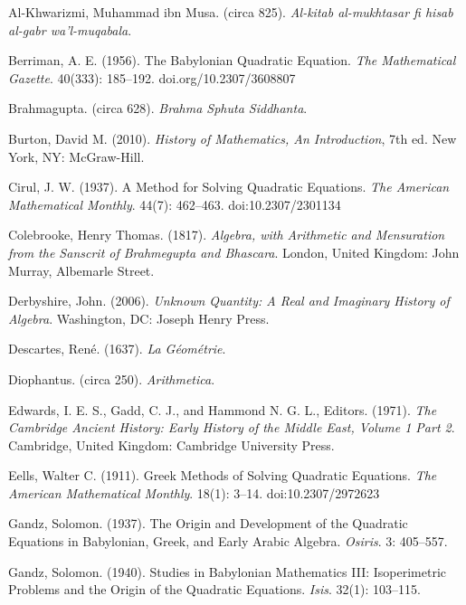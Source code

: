 \begin{thebibliography}{99}

   Al-Khwarizmi, Muhammad ibn Musa. (circa 825).
    \emph{Al-kitab al-mukhtasar fi hisab al-gabr wa'l-muqabala}.

   Berriman, A. E. (1956). The Babylonian Quadratic
    Equation.  \emph{The Mathematical Gazette}. 40(333): 185--192.
    doi.org/10.2307/3608807

   Brahmagupta. (circa 628). \emph{Brahma Sphuta
    Siddhanta}.

   Burton, David M. (2010). \emph{History of Mathematics,
    An Introduction}, 7th ed. New York, NY: McGraw-Hill.

   Cirul, J. W. (1937). A Method for Solving Quadratic
    Equations. \emph{The American Mathematical Monthly}. 44(7): 462--463.
    doi:10.2307/2301134

   Colebrooke, Henry Thomas. (1817). \emph{Algebra,
    with Arithmetic and Mensuration from the Sanscrit of Brahmegupta and
  Bhascara}. London, United Kingdom: John Murray, Albemarle Street.

   Derbyshire, John. (2006). \emph{Unknown Quantity: A
    Real and Imaginary History of Algebra}. Washington, DC: Joseph Henry
    Press.

   Descartes, Ren\'e. (1637). \emph{La G\'eom\'etrie}.

   Diophantus. (circa 250). \emph{Arithmetica}.

   Edwards, I. E. S., Gadd, C. J., and Hammond N.
    G. L., Editors. (1971). \emph{The Cambridge Ancient History: Early
    History of the Middle East, Volume 1 Part 2}. Cambridge, United
    Kingdom: Cambridge University Press.

   Eells, Walter C. (1911). Greek Methods of Solving
    Quadratic Equations. \emph{The American Mathematical Monthly}.
    18(1): 3--14. doi:10.2307/2972623

   Gandz, Solomon. (1937). The Origin and Development
    of the Quadratic Equations in Babylonian, Greek, and Early Arabic
    Algebra. \emph{Osiris}. 3: 405--557.

   Gandz, Solomon. (1940). Studies in Babylonian
    Mathematics III: Isoperimetric Problems and the Origin of the Quadratic
    Equations. \emph{Isis}. 32(1): 103--115.


\end{thebibliography}
